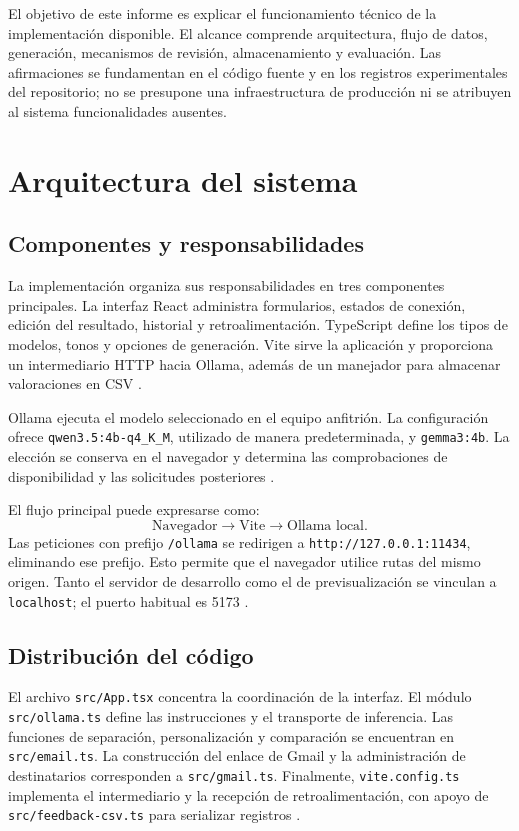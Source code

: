 \documentclass[conference]{IEEEtran}
\begin{document}
El objetivo de este informe es explicar el funcionamiento técnico de la implementación disponible. El alcance comprende arquitectura, flujo de datos, generación, mecanismos de revisión, almacenamiento y evaluación. Las afirmaciones se fundamentan en el código fuente y en los registros experimentales del repositorio; no se presupone una infraestructura de producción ni se atribuyen al sistema funcionalidades ausentes.

\section{Arquitectura del sistema}
\subsection{Componentes y responsabilidades}
La implementación organiza sus responsabilidades en tres componentes principales. La interfaz React administra formularios, estados de conexión, edición del resultado, historial y retroalimentación. TypeScript define los tipos de modelos, tonos y opciones de generación. Vite sirve la aplicación y proporciona un intermediario HTTP hacia Ollama, además de un manejador para almacenar valoraciones en CSV \cite{app,vite}.

Ollama ejecuta el modelo seleccionado en el equipo anfitrión. La configuración ofrece \texttt{qwen3.5:4b-q4\_K\_M}, utilizado de manera predeterminada, y \texttt{gemma3:4b}. La elección se conserva en el navegador y determina las comprobaciones de disponibilidad y las solicitudes posteriores \cite{ollama}.

El flujo principal puede expresarse como:
\begin{equation}
\text{Navegador} \rightarrow \text{Vite} \rightarrow \text{Ollama local}.
\end{equation}
Las peticiones con prefijo \texttt{/ollama} se redirigen a \texttt{http://127.0.0.1:11434}, eliminando ese prefijo. Esto permite que el navegador utilice rutas del mismo origen. Tanto el servidor de desarrollo como el de previsualización se vinculan a \texttt{localhost}; el puerto habitual es 5173 \cite{vite}.

\subsection{Distribución del código}
El archivo \texttt{src/App.tsx} concentra la coordinación de la interfaz. El módulo \texttt{src/ollama.ts} define las instrucciones y el transporte de inferencia. Las funciones de separación, personalización y comparación se encuentran en \texttt{src/email.ts}. La construcción del enlace de Gmail y la administración de destinatarios corresponden a \texttt{src/gmail.ts}. Finalmente, \texttt{vite.config.ts} implementa el intermediario y la recepción de retroalimentación, con apoyo de \texttt{src/feedback-csv.ts} para serializar registros \cite{app,ollama,email,gmail,vite}.
\end{document}
